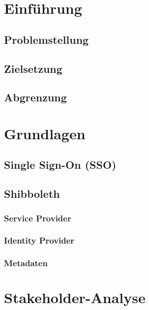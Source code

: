 \documentclass[11pt,a4paper]{scrartcl}
\begin{document}


\tableofcontents
\newpage


\section{Einführung}\label{sec:einfuehrung}
   \subsection{Problemstellung}\label{subsec:problemstellung}
   \subsection{Zielsetzung}\label{subsec:zielsetzung}
   \subsection{Abgrenzung}\label{subsec:abgrenzung}

\section{Grundlagen}\label{sec:grundlagen}
   \subsection{Single Sign-On (SSO)}\label{subsec:sso}
   \subsection{Shibboleth}\label{subsec:shibboleth}
      \subsubsection{Service Provider}\label{subsubsec:shib-sp}
      \subsubsection{Identity Provider}\label{subsubsec:shib-idp}
      \subsubsection{Metadaten}\label{subsubsec:shib-metadata}

\section{Stakeholder-Analyse}\label{sec:stakeholder}
\end{document}
